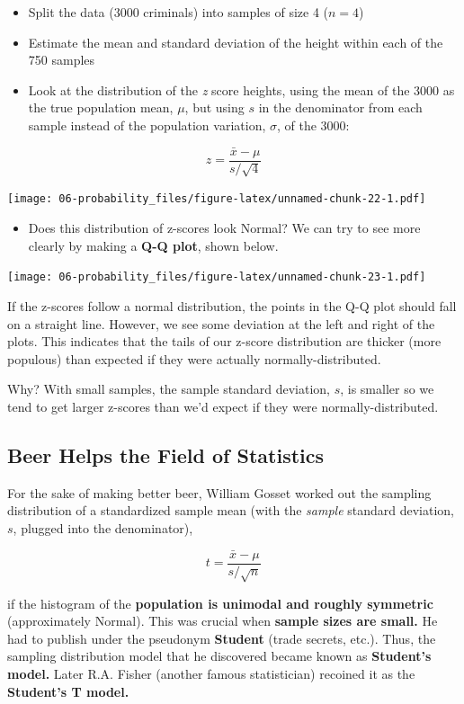 \documentclass[
]{book}
\providecommand{\tightlist}{%
  \setlength{\itemsep}{0pt}\setlength{\parskip}{0pt}}
\begin{document}
\begin{itemize}
\tightlist
\item
  Split the data (3000 criminals) into samples of size 4 (\(n=4\))
\item
  Estimate the mean and standard deviation of the height within each of the 750 samples
\item
  Look at the distribution of the \emph{z} score heights, using the mean of the 3000 as the true population mean, \(\mu\), but using \(s\) in the denominator from each sample instead of the population variation, \(\sigma\), of the 3000:
\end{itemize}

\[ z = \frac{\bar{x} - \mu}{s/\sqrt{4}}\]

\texttt{[image: 06-probability\_files/figure-latex/unnamed-chunk-22-1.pdf]}

\begin{itemize}
\tightlist
\item
  Does this distribution of z-scores look Normal? We can try to see more clearly by making a \textbf{Q-Q plot}, shown below.
\end{itemize}

\texttt{[image: 06-probability\_files/figure-latex/unnamed-chunk-23-1.pdf]}

If the z-scores follow a normal distribution, the points in the Q-Q plot should fall on a straight line. However, we see some deviation at the left and right of the plots. This indicates that the tails of our z-score distribution are thicker (more populous) than expected if they were actually normally-distributed.

Why? With small samples, the sample standard deviation, \(s\), is smaller so we tend to get larger z-scores than we'd expect if they were normally-distributed.

\hypertarget{beer-helps-the-field-of-statistics}{%
\subsection{Beer Helps the Field of Statistics}\label{beer-helps-the-field-of-statistics}}

For the sake of making better beer, William Gosset worked out the sampling distribution of a standardized sample mean (with the \emph{sample} standard deviation, \(s\), plugged into the denominator),

\[t = \frac{\bar{x} - \mu}{s/\sqrt{n}}\]

if the histogram of the \textbf{population is unimodal and roughly symmetric} (approximately Normal). This was crucial when \textbf{sample sizes are small.} He had to publish under the pseudonym \textbf{Student} (trade secrets, etc.). Thus, the sampling distribution model that he discovered became known as \textbf{Student's model.} Later R.A. Fisher (another famous statistician) recoined it as the \textbf{Student's T model.}
\end{document}
